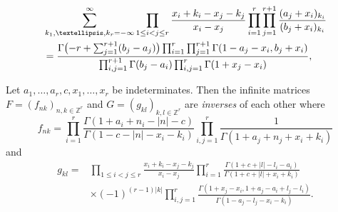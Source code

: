 \documentclass[10pt,a4paper]{amsart}
\newcommand{\Ga}{\Gamma}
\begin{document}
\begin{align}\label{eq:ar2H2}
&\sum_{k_1,\dots,k_r=-\infty}^\infty
\prod_{1\le i<j\le r}\frac{x_i+k_i-x_j-k_j}{x_i-x_j}
\prod_{i=1}^r\prod_{j=1}^{r+1}\frac{(a_j+x_i)_{k_i}}{(b_j+x_i)_{k_i}}\notag\\
&=\frac{\Gamma\big({-}r+\sum_{j=1}^{r+1}(b_j-a_j)\big)
\prod_{i=1}^r\prod_{j=1}^{r+1}\Gamma(1-a_j-x_i,b_j+x_i)}
{\prod_{i,j=1}^{r+1}\Gamma(b_j-a_i)
\prod_{i,j=1}^{r}\Gamma(1+x_j-x_i)},
\end{align}

\begin{theorem}\label{thm:mmi}
Let $a_1,\ldots,a_r,c,x_1,\ldots,x_r$ be indeterminates. Then the infinite matrices
$F=(f_{nk})_{n,k\in\mathbb Z^r}$ and $G=(g_{kl})_{k,l\in\mathbb Z^r}$ are
\textit{inverses} of each other where
\begin{equation*}
f_{nk}=
\prod_{i=1}^r\frac{\Ga(1+a_i+n_i-|n|-c)}{\Ga(1-c-|n|-x_i-k_i)}
\prod_{i,j=1}^r\frac1{\Ga(1+a_j+n_j+x_i+k_i)}
\end{equation*}
and
\begin{align*}
g_{kl}={}&\prod_{1\le i<j\le r}\frac{x_i+k_i-x_j-k_j}{x_i-x_j}
\prod_{i=1}^r\frac{\Ga(1+c+|l|-l_i-a_i)}
{\Ga(1+c+|l|+x_i+k_i)}\\
&\times(-1)^{(r-1)|k|}\prod_{i,j=1}^r\frac{\Ga(1+x_j-x_i,1+a_j-a_i+l_j-l_i)}
{\Ga(1-a_j-l_j-x_i-k_i)}.
\end{align*}
\end{theorem}
\end{document}
